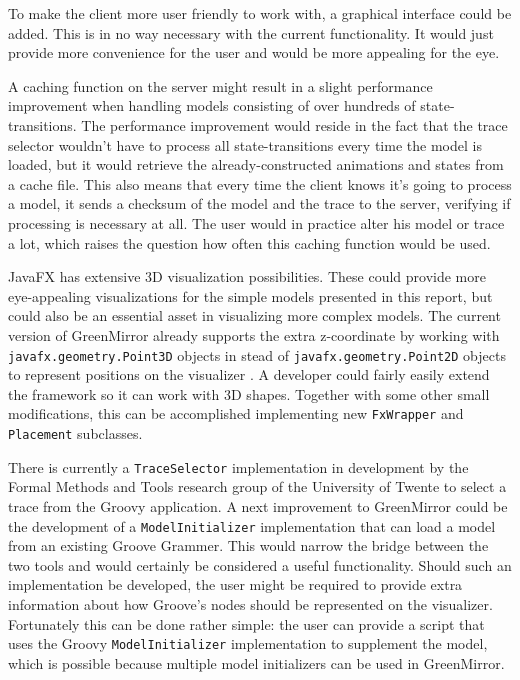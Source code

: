 \documentclass[a4paper]{article}
\begin{document}
	To make the client more user friendly to work with, a graphical interface could be added. This is in no way necessary with the current functionality. It would just provide more convenience for the user and would be more appealing for the eye.
	
	A caching function on the server might result in a slight performance improvement when handling models consisting of over hundreds of state-transitions. The performance improvement would reside in the fact that the trace selector wouldn't have to process all state-transitions every time the model is loaded, but it would retrieve the already-constructed animations and states from a cache file. This also means that every time the client knows it's going to process a model, it sends a checksum of the model and the trace to the server, verifying if processing is necessary at all. The user would in practice alter his model or trace a lot, which raises the question how often this caching function would be used.
	
	JavaFX has extensive 3D visualization possibilities. These could provide more eye-appealing visualizations for the simple models presented in this report, but could also be an essential asset in visualizing more complex models. The current version of GreenMirror already supports the extra z-coordinate by working with \lstinline{javafx.geometry.Point3D} objects in stead of \lstinline{javafx.geometry.Point2D} objects to represent positions on the visualizer . A developer could fairly easily extend the framework so it can work with 3D shapes. Together with some other small modifications, this can be accomplished implementing new \lstinline{FxWrapper} and \lstinline{Placement} subclasses.
	
	There is currently a \lstinline{TraceSelector} implementation in development by the Formal Methods and Tools research group of the University of Twente to select a trace from the Groovy application. A next improvement to GreenMirror could be the development of a \lstinline{ModelInitializer} implementation that can load a model from an existing Groove Grammer. This would narrow the bridge between the two tools and would certainly be considered a useful functionality. Should such an implementation be developed, the user might be required to provide extra information about how Groove's nodes should be represented on the visualizer. Fortunately this can be done rather simple: the user can provide a script that uses the Groovy \lstinline{ModelInitializer} implementation to supplement the model, which is possible because multiple model initializers can be used in GreenMirror.
	
\end{document}
